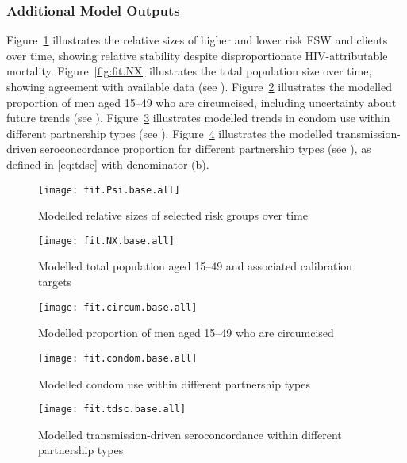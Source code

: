 \subsubsection{Additional Model Outputs}\label{sr.cal.other}
Figure~\ref{fig:fit.Psi} illustrates
the relative sizes of higher and lower risk FSW and clients over time,
showing relative stability despite disproportionate HIV-attributable mortality.
Figure~\ref{fig:fit.NX} illustrates the total population size over time,
showing agreement with available data \cite{WorldBank} (see ).
Figure~\ref{fig:fit.circum} illustrates
the modelled proportion of men aged 15--49 who are circumcised,
including uncertainty about future trends (see ).
Figure~\ref{fig:fit.condom} illustrates
modelled trends in condom use within different partnership types (see ).
Figure~\ref{fig:fit.tdsc} illustrates
the modelled transmission-driven seroconcordance proportion
for different partnership types (see ),
as defined in \eqref{eq:tdsc} with denominator (b).
\begin{figure}
  \centering\texttt{[image: fit.Psi.base.all]}
  \caption{Modelled relative sizes of selected risk groups over time}
  \label{fig:fit.Psi}
\end{figure}
\begin{figure}
  \begin{minipage}[t]{.45\linewidth}
    \centering\texttt{[image: fit.NX.base.all]}
    \caption{Modelled total population aged 15--49
      and associated calibration targets}
    \label{fig:fit.NX}
  \end{minipage}\hfill
  \begin{minipage}[t]{.45\linewidth}
    \centering\texttt{[image: fit.circum.base.all]}
    \caption{Modelled proportion of men aged 15--49 who are circumcised}
    \label{fig:fit.circum}
  \end{minipage}
\end{figure}
\begin{figure}
  \centering\texttt{[image: fit.condom.base.all]}
  \caption{Modelled condom use within different partnership types}
  \label{fig:fit.condom}
\end{figure}
\begin{figure}
  \centering\texttt{[image: fit.tdsc.base.all]}
  \caption{Modelled transmission-driven seroconcordance within different partnership types}
  \label{fig:fit.tdsc}
\end{figure}
